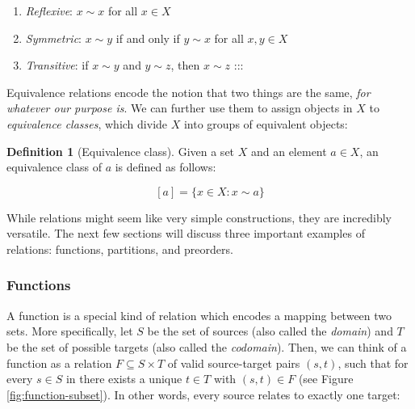 \documentclass[
  openany]{book}
\providecommand{\tightlist}{%
  \setlength{\itemsep}{0pt}\setlength{\parskip}{0pt}}
\theoremstyle{definition}
\newtheorem{definition}{Definition}[chapter]
\theoremstyle{definition}
\theoremstyle{definition}
\theoremstyle{definition}
\theoremstyle{remark}
\begin{document}
\begin{enumerate}
\def\labelenumi{\arabic{enumi}.}
\tightlist
\item
  \emph{Reflexive}: \(x \sim x\) for all \(x \in X\)
\item
  \emph{Symmetric}: \(x \sim y\) if and only if \(y \sim x\) for all \(x, y \in X\)
\item
  \emph{Transitive}: if \(x \sim y\) and \(y \sim z\), then \(x \sim z\)
  :::
\end{enumerate}

Equivalence relations encode the notion that two things are the same, \emph{for whatever our purpose is}. We can further use them to assign objects in \(X\) to \emph{equivalence classes}, which divide \(X\) into groups of equivalent objects:

\begin{definition}[Equivalence class]
Given a set \(X\) and an element \(a \in X\), an equivalence class of \(a\) is defined as follows:

\[[a] = \{ x \in X : x \sim a \}\]
\end{definition}

While relations might seem like very simple constructions, they are incredibly versatile. The next few sections will discuss three important examples of relations: functions, partitions, and preorders.

\subsubsection{Functions}\label{functions}

A function is a special kind of relation which encodes a mapping between two sets. More specifically, let \(S\) be the set of sources (also called the \emph{domain}) and \(T\) be the set of possible targets (also called the \emph{codomain}). Then, we can think of a function as a relation \(F \subseteq S \times T\) of valid source-target pairs \((s, t)\), such that for every \(s \in S\) in there exists a unique \(t \in T\) with \((s, t) \in F\) (see Figure \ref{fig:function-subset}). In other words, every source relates to exactly one target:
\end{document}
